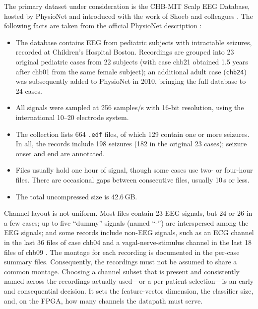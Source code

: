 \documentclass[10pt,twocolumn,letterpaper]{article}
\begin{document}
The primary dataset under consideration is the CHB-MIT Scalp EEG
Database, hosted by PhysioNet \cite{guttag2010chbmit,goldberger2000physionet}
and introduced with the work of Shoeb and colleagues
\cite{shoeb2009thesis,shoeb2010icml}. The following facts are taken from
the official PhysioNet description \cite{guttag2010chbmit}:
\begin{itemize}
  \item The database contains EEG from pediatric subjects with
    intractable seizures, recorded at Children's Hospital Boston.
    Recordings are grouped into 23 original pediatric cases from 22 subjects (with case chb21
    obtained 1.5 years after chb01 from the same female subject); an additional adult case (\texttt{chb24})
    was subsequently added to PhysioNet in 2010, bringing the full database to 24 cases.
  \item All signals were sampled at 256 samples/s with 16-bit
    resolution, using the international 10--20 electrode system.
  \item The collection lists 664 \texttt{.edf} files, of which 129
    contain one or more seizures. In all, the records include 198
    seizures (182 in the original 23 cases); seizure onset and end are
    annotated.
  \item Files usually hold one hour of signal, though some cases use
    two- or four-hour files. There are occasional gaps between
    consecutive files, usually 10\,s or less.
  \item The total uncompressed size is 42.6\,GB.
\end{itemize}

Channel layout is not uniform. Most files contain 23 EEG signals, but 24
or 26 in a few cases; up to five ``dummy'' signals (named ``-'') are
interspersed among the EEG signals; and some records include non-EEG
signals, such as an ECG channel in the last 36 files of case chb04 and a
vagal-nerve-stimulus channel in the last 18 files of chb09
\cite{guttag2010chbmit}. The montage for each recording is documented in
the per-case summary files. Consequently, the recordings must not be
assumed to share a common montage. Choosing a channel subset that is
present and consistently named across the recordings actually used---or
a per-patient selection---is an early and consequential decision. It
sets the feature-vector dimension, the classifier size, and, on the
FPGA, how many channels the datapath must serve.
\end{document}
